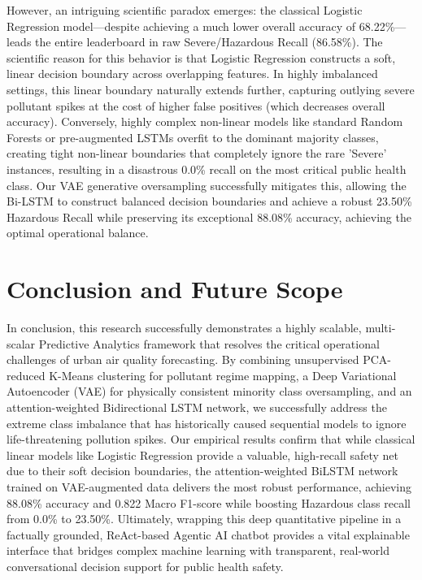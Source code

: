 \documentclass[conference]{IEEEtran}
\begin{document}
However, an intriguing scientific paradox emerges: the classical Logistic Regression model---despite achieving a much lower overall accuracy of 68.22\%---leads the entire leaderboard in raw Severe/Hazardous Recall (86.58\%). The scientific reason for this behavior is that Logistic Regression constructs a soft, linear decision boundary across overlapping features. In highly imbalanced settings, this linear boundary naturally extends further, capturing outlying severe pollutant spikes at the cost of higher false positives (which decreases overall accuracy). Conversely, highly complex non-linear models like standard Random Forests or pre-augmented LSTMs overfit to the dominant majority classes, creating tight non-linear boundaries that completely ignore the rare 'Severe' instances, resulting in a disastrous 0.0\% recall on the most critical public health class. Our VAE generative oversampling successfully mitigates this, allowing the Bi-LSTM to construct balanced decision boundaries and achieve a robust 23.50\% Hazardous Recall while preserving its exceptional 88.08\% accuracy, achieving the optimal operational balance.

\section{Conclusion and Future Scope}
In conclusion, this research successfully demonstrates a highly scalable, multi-scalar Predictive Analytics framework that resolves the critical operational challenges of urban air quality forecasting. By combining unsupervised PCA-reduced K-Means clustering for pollutant regime mapping, a Deep Variational Autoencoder (VAE) for physically consistent minority class oversampling, and an attention-weighted Bidirectional LSTM network, we successfully address the extreme class imbalance that has historically caused sequential models to ignore life-threatening pollution spikes. Our empirical results confirm that while classical linear models like Logistic Regression provide a valuable, high-recall safety net due to their soft decision boundaries, the attention-weighted BiLSTM network trained on VAE-augmented data delivers the most robust performance, achieving 88.08\% accuracy and 0.822 Macro F1-score while boosting Hazardous class recall from 0.0\% to 23.50\%. Ultimately, wrapping this deep quantitative pipeline in a factually grounded, ReAct-based Agentic AI chatbot provides a vital explainable interface that bridges complex machine learning with transparent, real-world conversational decision support for public health safety.
\end{document}
